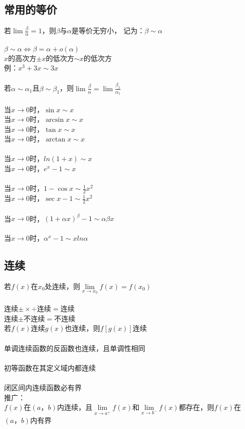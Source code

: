 \documentclass{article}
\begin{document}
\begin{flushleft}
\subsection{常用的等价}

若$\lim \frac{\beta}{\alpha}=1$，则$\beta$与$\alpha$是等价无穷小，
记为：$\beta \sim \alpha$\\
~\\
$\beta \sim \alpha \Leftrightarrow \beta = \alpha + o(\alpha)$\\
$x$的高次方$\pm x$的低次方$\sim x$的低次方\\
\qquad 例：$x^3+3x\sim 3x$\\
~\\
若$\alpha \sim \alpha_1$且$\beta \sim \beta_1$，则$\lim \frac{\beta}{\alpha} = \lim \frac{\beta_1}{\alpha_1}$\\
~\\
当$x\to 0$时，$\sin x \sim x$\\
当$x\to 0$时，$\arcsin x \sim x$\\
当$x\to 0$时，$\tan x \sim x$\\
当$x\to 0$时，$\arctan x \sim x$\\
~\\
当$x\to 0$时，$ln(1+x) \sim x$\\
当$x\to 0$时，$e^x-1 \sim x$\\
~\\
当$x\to 0$时，$1-\cos x \sim \frac{1}{2} x^2$\\
当$x\to 0$时，$\sec x - 1 \sim \frac{1}{2} x^2$\\
~\\
当$x\to 0$时，$(1+\alpha x)^\beta -1 \sim \alpha\beta x$\\
~\\
当$x\to 0$时，$\alpha^x -1 \sim xln\alpha$\\

\subsection{连续}

若$f(x)$在$x_0$处连续，则$\lim\limits_{x\to x_0} f(x)=f(x_0)$\\
~\\
连续$\pm\times\div$连续$=$连续\\
连续$\pm$不连续$=$不连续\\
若$f(x)$连续$g(x)$也连续，则$f[g(x)]$连续\\
~\\
单调连续函数的反函数也连续，且单调性相同\\
~\\
初等函数在其定义域内都连续\\
~\\
闭区间内连续函数必有界\\
推广：\\
$f(x)$在$(a，b)$内连续，且$\lim\limits_{x\to a^+} f(x)$和$\lim\limits_{x\to b^-} f(x)$都存在，则$f(x)$在$(a，b)$内有界\\
~\\

\end{flushleft}
\end{document}
